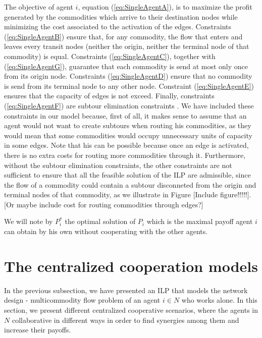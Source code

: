 \documentclass[review]{elsarticle}
\begin{document}
The objective of agent $i$, equation (\ref{eq:SingleAgentA}), is to maximize the
profit generated by the commodities which arrive to their destination nodes
while minimizing the cost associated to the activation of the edges. Constraints
(\ref{eq:SingleAgentB}) ensure that, for any commodity, the flow that enters
and leaves every transit nodes (neither the origin, neither the terminal node of
that commodity) is equal. Constraints (\ref{eq:SingleAgentC}), together with
(\ref{eq:SingleAgentG}), guarantee that each commodity is send at most only once
from its origin node. Constraints (\ref{eq:SingleAgentD}) ensure that no
commodity is send from its terminal node to any other node. Constraint (\ref{eq:SingleAgentE})
ensures that the capacity of edges is not exceed. Finally, constraints
(\ref{eq:SingleAgentF}) are subtour elimination constraints \cite{AHUJA1993}. We have included these constraints in our model because, first of all, it makes sense to assume that an agent would not want to create subtours when routing his commodities, as they would mean that some commodities would occupy unnecessary units of capacity in some edges. Note that his can be possible because once an edge is activated, there is no extra costs for routing more commodities through it. Furthermore, without the subtour elimination constraints, the other constraints are not sufficient to ensure that all the feasible solution of the ILP are admissible, since the flow of a commodity could contain a subtour disconneted from the origin and terminal nodes of that commodity, as we illustrate in Figure [Include figure!!!!!]. [Or maybe include cost for routing commodities through edges?]

We will note by $P_i^*$ the optimal solution of $P_i$ which is the maximal
payoff agent $i$ can obtain by his own without cooperating with the other agents.

\section{The centralized cooperation models}

In the previous subsection, we have presented an ILP that models the network design - multicommodity flow problem of an agent $i\in N$ who works alone. In this section, we present different centralized cooperative scenarios, where the agents in $N$ collaborative in different ways in order to find synergies among them and increase their payoffs.
\end{document}
